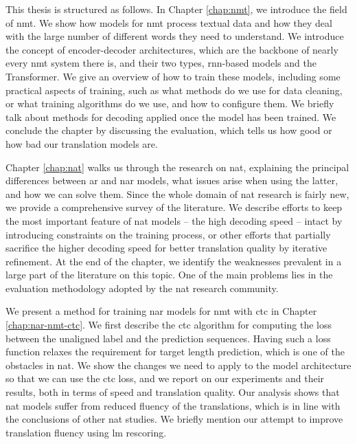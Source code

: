 

\vspace{\baselineskip}

This thesis is structured as follows.
%
In Chapter \ref{chap:nmt}, we introduce the field of \ac{nmt}. We show how
models for \ac{nmt} process textual data and how they deal with the large
number of different words they need to understand. We introduce the concept of
encoder-decoder architectures, which are the backbone of nearly every \ac{nmt}
system there is, and their two types, \acs{rnn}-based models and the
Transformer. We give an overview of how to train these models, including some
practical aspects of training, such as what methods do we use for data
cleaning, or what training algorithms do we use, and how to configure them. We
briefly talk about methods for decoding applied once the model has been
trained. We conclude the chapter by discussing the evaluation, which tells us
how good or how bad our translation models are.

Chapter \ref{chap:nat} walks us through the research on \ac{nat}, explaining
the principal differences between \acl{ar} and \acl{nar} models, what issues
arise when using the latter, and how we can solve them.  Since the whole domain
of \ac{nat} research is fairly new, we provide a comprehensive survey of the
literature. We describe efforts to keep the most important feature of \ac{nat}
models -- the high decoding speed -- intact by introducing constraints on the
training process, or other efforts that partially sacrifice the higher decoding
speed for better translation quality by iterative refinement. At the end of the
chapter, we identify the weaknesses prevalent in a large part of the literature
on this topic. One of the main problems lies in the evaluation methodology
adopted by the \ac{nat} research community.

We present a method for training \acl{nar} models for \ac{nmt} with \ac{ctc} in
Chapter \ref{chap:nar-nmt-ctc}. We first describe the \ac{ctc} algorithm for
computing the loss between the unaligned label and the prediction
sequences. Having such a loss function relaxes the requirement for target
length prediction, which is one of the obstacles in \ac{nat}. We show the
changes we need to apply to the model architecture so that we can use the
\ac{ctc} loss, and we report on our experiments and their results, both in
terms of speed and translation quality.  Our analysis shows that \ac{nat}
models suffer from reduced fluency of the translations, which is in line with
the conclusions of other \ac{nat} studies.  We briefly mention our attempt to
improve translation fluency using \acl{lm} rescoring.

